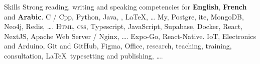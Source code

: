
\begin{rubric}{Skills}
    \entry*[Languages]
    Strong reading, writing and speaking competencies for \textbf{English}, \textbf{French} and \textbf{Arabic}.
    C / Cpp, Python, Java, , \LaTeX, \ldots
    \entry*[Databases]
    My, Postgre, ite, MongoDB, Neo4j, Redis, \ldots.
    \textsc{Html, css}, Typescript, JavaScript, Supabase, Docker, React, NextJS, Apache Web Server / Nginx, \ldots.
    Expo-Go, React-Native.
    \entry*[Misc.]
    IoT, Electronics and Arduino, Git and GitHub, Figma, Office, research, teaching, training, consultation, \LaTeX\ typesetting and publishing, \ldots.
\end{rubric}
